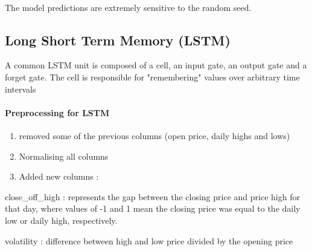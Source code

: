 \documentclass[11pt]{article}
\providecommand{\tightlist}{%
      \setlength{\itemsep}{0pt}\setlength{\parskip}{0pt}}
\begin{document}
    \begin{center}
    \end{center}
    { \hspace*{\fill} \\}
    
    The model predictions are extremely sensitive to the random seed.

    \subsection{Long Short Term Memory
(LSTM)}\label{long-short-term-memory-lstm}

A common LSTM unit is composed of a cell, an input gate, an output gate
and a forget gate. The cell is responsible for "remembering" values over
arbitrary time intervals

    \paragraph{Preprocessing for LSTM}\label{preprocessing-for-lstm}

\begin{enumerate}
\def\labelenumi{\arabic{enumi}.}
\tightlist
\item
  removed some of the previous columns (open price, daily highs and
  lows)
\item
  Normalising all columns
\item
  Added new columns :
\end{enumerate}

close\_off\_high : represents the gap between the closing price and
price high for that day, where values of -1 and 1 mean the closing price
was equal to the daily low or daily high, respectively.

volatility : difference between high and low price divided by the
opening price
\end{document}
